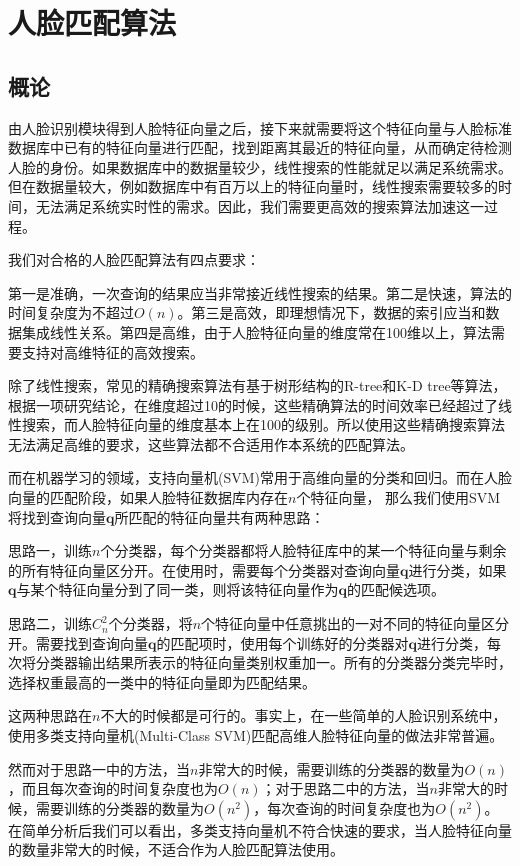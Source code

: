 \chapter{人脸匹配算法}

\section{概论}

由人脸识别模块得到人脸特征向量之后，接下来就需要将这个特征向量与人脸标准数据库中已有的特征向量进行匹配，找到距离其最近的特征向量，从而确定待检测人脸的身份。如果数据库中的数据量较少，线性搜索的性能就足以满足系统需求。但在数据量较大，例如数据库中有百万以上的特征向量时，线性搜索需要较多的时间，无法满足系统实时性的需求。因此，我们需要更高效的搜索算法加速这一过程。

我们对合格的人脸匹配算法有四点要求：

第一是准确，一次查询的结果应当非常接近线性搜索的结果。第二是快速，算法的时间复杂度为不超过$O(n)$。第三是高效，即理想情况下，数据的索引应当和数据集成线性关系。第四是高维，由于人脸特征向量的维度常在100维以上，算法需要支持对高维特征的高效搜索。

除了线性搜索，常见的精确搜索算法有基于树形结构的R-tree和K-D tree等算法，根据一项研究结论，在维度超过10的时候，这些精确算法的时间效率已经超过了线性搜索\cite{weber1998quantitative}，而人脸特征向量的维度基本上在100的级别。所以使用这些精确搜索算法无法满足高维的要求，这些算法都不合适用作本系统的匹配算法。

而在机器学习的领域，支持向量机(SVM)常用于高维向量的分类和回归。而在人脸向量的匹配阶段，如果人脸特征数据库内存在$n$个特征向量， 那么我们使用SVM将找到查询向量$\mathbf{q}$所匹配的特征向量共有两种思路：

思路一，训练$n$个分类器，每个分类器都将人脸特征库中的某一个特征向量与剩余的所有特征向量区分开。在使用时，需要每个分类器对查询向量$\mathbf{q}$进行分类，如果$\mathbf{q}$与某个特征向量分到了同一类，则将该特征向量作为$\mathbf{q}$的匹配候选项。

思路二，训练$C_n^2$个分类器，将$n$个特征向量中任意挑出的一对不同的特征向量区分开。需要找到查询向量$\mathbf{q}$的匹配项时，使用每个训练好的分类器对$\mathbf{q}$进行分类，每次将分类器输出结果所表示的特征向量类别权重加一。所有的分类器分类完毕时，选择权重最高的一类中的特征向量即为匹配结果。

这两种思路在$n$不大的时候都是可行的。事实上，在一些简单的人脸识别系统中，使用多类支持向量机(Multi-Class SVM)匹配高维人脸特征向量的做法非常普遍。

然而对于思路一中的方法，当$n$非常大的时候，需要训练的分类器的数量为$O(n)$，而且每次查询的时间复杂度也为$O(n)$；对于思路二中的方法，当$n$非常大的时候，需要训练的分类器的数量为$O(n^2)$，每次查询的时间复杂度也为$O(n^2)$。在简单分析后我们可以看出，多类支持向量机不符合快速的要求，当人脸特征向量的数量非常大的时候，不适合作为人脸匹配算法使用。

